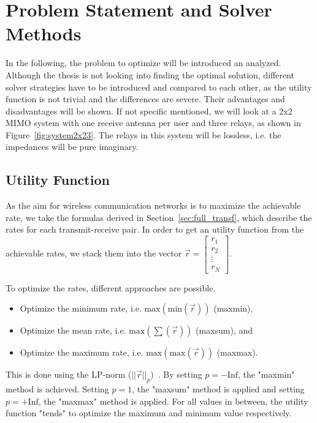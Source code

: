 \chapter{Problem Statement and Solver Methods}
\label{sec:solver}

In the following, the problem to optimize will be introduced an analyzed.
Although the thesis is not looking into finding the optimal solution, different solver strategies have to be introduced and compared to each other, as the utility function is not trivial and the differences are severe.
Their advantages and disadvantages will be shown.
If not specific mentioned, we will look at a 2x2 MIMO system with one receive antenna per user and three relays, as shown in Figure~\ref{fig:system2x23}.
The relays in this system will be lossless, i.e. the impedances will be pure imaginary.

\section{Utility Function}
\label{sec:utility_function}
As the aim for wireless communication networks is to maximize the achievable rate, we take the formulas derived in Section~\ref{sec:full_transf}, which describe the rates for each transmit-receive pair.
In order to get an utility function from the achievable rates, we stack them into the vector $\vec{r} = \begin{bmatrix}
r_1 \\ r_2 \\ \vdots \\ r_N
\end{bmatrix}$.

To optimize the rates, different approaches are possible.
\begin{itemize}
\item Optimize the minimum rate, i.e. $\text{max}\left(\text{min}(\vec{r})\right)$ (maxmin),
\item Optimize the mean rate, i.e. $\text{max}\left(\sum(\vec{r})\right)$ (maxsum), and
\item Optimize the maximum rate, i.e. $\text{max}\left(\text{max}(\vec{r})\right)$ (maxmax).
\end{itemize}

This is done using the LP-norm ($||\vec{r}||_p$)~\cite{wiki:lp_space}.
By setting $p = -\text{Inf}$, the "maxmin" method is achieved.
Setting $p = 1$, the "maxsum" method is applied and setting $p = +\text{Inf}$, the "maxmax" method is applied.
For all values in between, the utility function "tends" to optimize the maximum and minimum value respectively.

